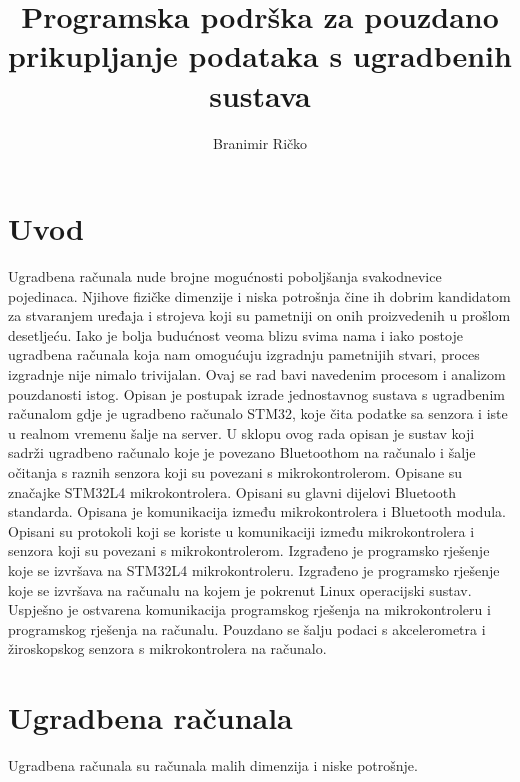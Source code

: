 \documentclass[times, utf8, diplomski]{diplomski}
\begin{document}

\title{Programska podrška za pouzdano prikupljanje podataka s ugradbenih sustava}

\author{Branimir Ričko}

\maketitle


\tableofcontents

\chapter{Uvod}
Ugradbena računala nude brojne mogućnosti poboljšanja svakodnevice pojedinaca.
Njihove fizičke dimenzije i niska potrošnja čine ih dobrim kandidatom za stvaranjem uređaja i strojeva koji su pametniji on onih proizvedenih u prošlom desetljeću.
Iako je bolja budućnost veoma blizu svima nama i iako postoje ugradbena računala koja nam omogućuju izgradnju pametnijih stvari, proces izgradnje nije nimalo trivijalan.
Ovaj se rad bavi navedenim procesom i analizom pouzdanosti istog.
Opisan je postupak izrade jednostavnog sustava s ugradbenim računalom gdje je ugradbeno računalo STM32, koje čita podatke sa senzora i iste u realnom vremenu šalje na server.
U sklopu ovog rada opisan je sustav koji sadrži ugradbeno računalo koje je povezano Bluetoothom na računalo i šalje očitanja s raznih senzora koji su povezani s mikrokontrolerom.
Opisane su značajke STM32L4 mikrokontrolera.
Opisani su glavni dijelovi Bluetooth standarda.
Opisana je komunikacija između mikrokontrolera i Bluetooth modula.
Opisani su protokoli koji se koriste u komunikaciji između mikrokontrolera i senzora koji su povezani s mikrokontrolerom.
Izgrađeno je programsko rješenje koje se izvršava na STM32L4 mikrokontroleru.
Izgrađeno je programsko rješenje koje se izvršava na računalu na kojem je pokrenut Linux operacijski sustav.
Uspješno je ostvarena komunikacija programskog rješenja na mikrokontroleru i programskog rješenja na računalu.
Pouzdano se šalju podaci s akcelerometra i žiroskopskog senzora s mikrokontrolera na računalo.

\chapter{Ugradbena računala}
Ugradbena računala su računala malih dimenzija i niske potrošnje. 
\end{document}
